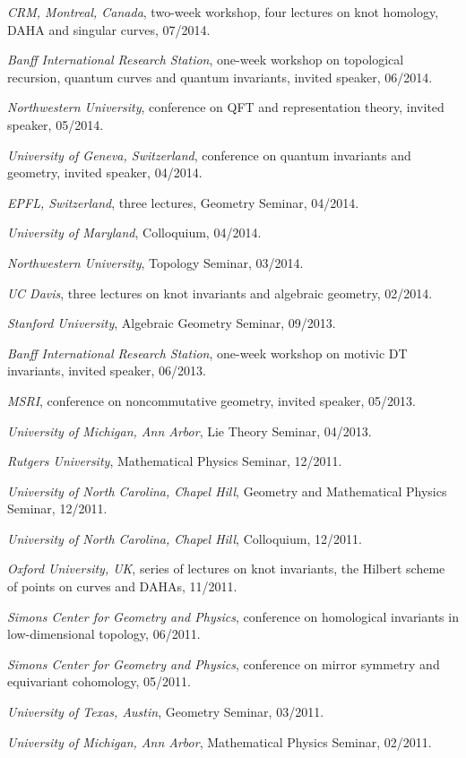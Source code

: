 \documentclass[11pt]{article}
\begin{document}
\begin{cvlist}
  \item \emph{CRM, Montreal, Canada}, two-week workshop, four lectures on
    knot homology, DAHA and singular curves, 07/2014.
  \item \emph{Banff International Research Station}, one-week workshop on
    topological recursion, quantum curves and quantum invariants, invited
    speaker, 06/2014.
  \item \emph{Northwestern University}, conference on QFT and representation
    theory, invited speaker, 05/2014.
  \item \emph{University of Geneva, Switzerland}, conference on quantum
    invariants and geometry, invited speaker, 04/2014.
  \item \emph{EPFL, Switzerland}, three lectures, Geometry Seminar, 04/2014.
  \item \emph{University of Maryland}, Colloquium, 04/2014.
  \item \emph{Northwestern University}, Topology Seminar, 03/2014.
  \item \emph{UC Davis}, three lectures on knot invariants and algebraic
    geometry, 02/2014.
\end{cvlist}

\begin{cvlist}
  \item \emph{Stanford University}, Algebraic Geometry Seminar, 09/2013.
  \item \emph{Banff International Research Station}, one-week workshop on
    motivic DT invariants, invited speaker, 06/2013.
  \item \emph{MSRI}, conference on noncommutative geometry, invited speaker,
    05/2013.
  \item \emph{University of Michigan, Ann Arbor}, Lie Theory Seminar,
    04/2013.
\end{cvlist}

\begin{cvlist}
  \item \emph{Rutgers University}, Mathematical Physics Seminar, 12/2011.
  \item \emph{University of North Carolina, Chapel Hill}, Geometry and
    Mathematical Physics Seminar, 12/2011.
  \item \emph{University of North Carolina, Chapel Hill}, Colloquium,
    12/2011.
  \item \emph{Oxford University, UK}, series of lectures on knot invariants,
    the Hilbert scheme of points on curves and DAHAs, 11/2011.
  \item \emph{Simons Center for Geometry and Physics}, conference on
    homological invariants in low-dimensional topology, 06/2011.
  \item \emph{Simons Center for Geometry and Physics}, conference on mirror
    symmetry and equivariant cohomology, 05/2011.
  \item \emph{University of Texas, Austin}, Geometry Seminar, 03/2011.
  \item \emph{University of Michigan, Ann Arbor}, Mathematical Physics
    Seminar, 02/2011.
\end{cvlist}
\end{document}
